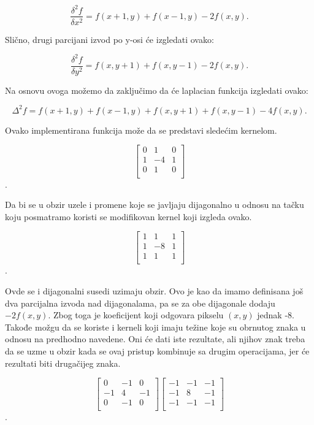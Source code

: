 \documentclass[a4paper,12pt,titlepage]{article}
\begin{document}
\begin{equation}\label{eq:grad2}
\dfrac{\delta^{2}f}{\delta x^{2}} = f(x + 1, y) + f(x - 1, y) - 2f(x, y).
\end{equation}

Slično, drugi parcijani izvod po y-osi će izgledati ovako:

\begin{equation}\label{eq:grad3}
\dfrac{\delta^{2}f}{\delta y^{2}} = f(x, y + 1) + f(x, y - 1) - 2f(x, y).
\end{equation}

Na osnovu ovoga možemo da zaključimo da će laplacian funkcija izgledati ovako:

\begin{equation}\label{eq:grad4}
\Delta^{2}f = f(x + 1, y) + f(x - 1, y) + f(x, y + 1) + f(x, y - 1) - 4f(x, y). 
\end{equation}

Ovako implementirana funkcija može da se predstavi sledećim kernelom.

\[
\begin{bmatrix}
     0 & 1 & 0 \\
     1 & -4 & 1 \\
     0 & 1 & 0 \\
\end{bmatrix}
\]. 

Da bi se u obzir uzele i promene koje se javljaju dijagonalno u odnosu na tačku koju posmatramo koristi se modifikovan kernel koji izgleda ovako.

\[
\begin{bmatrix}
     1 & 1 & 1 \\
     1 & -8 & 1 \\
     1 & 1 & 1 \\
\end{bmatrix}
\].

Ovde se i dijagonalni susedi uzimaju obzir. Ovo je kao da imamo definisana još dva parcijalna izvoda nad dijagonalama, pa se za obe dijagonale dodaju $-2f(x, y)$. Zbog toga je koeficijent koji odgovara pikselu $(x, y)$ jednak -8. Takođe možgu da se koriste i kerneli koji imaju težine koje su obrnutog znaka u odnosu na predhodno navedene. Oni će dati iste rezultate, ali njihov znak treba da se uzme u obzir kada se ovaj pristup kombinuje sa drugim operacijama, jer će rezultati biti drugačijeg znaka. 

\[
\begin{bmatrix}
     0 & -1 & 0 \\
     -1 & 4 & -1 \\
     0 & -1 & 0 \\
\end{bmatrix}
\begin{bmatrix}
     -1 & -1 & -1 \\
     -1 & 8 & -1 \\
     -1 & -1 & -1 \\
\end{bmatrix}
\]. 
\end{document}
